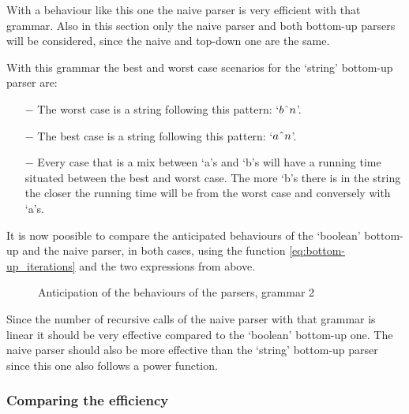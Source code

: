 With a behaviour like this one the naive parser is very efficient with that grammar.
Also in this section only the naive parser and both bottom-up parsers will be considered, since the naive and top-down one are the same.

With this grammar the best and worst case scenarios for the `string' bottom-up parser are:
\begin{itemize}
    \item[$-$] The worst case is a string following this pattern: `$b\string^ n$'.
    \item[$-$] The best case is a string following this pattern: `$a\string^ n$'.
    \item[$-$] Every case that is a mix between `a's and `b's will have a running time situated between the best and worst case.
        The more `b's there is in the string the closer the running time will be from the worst case and conversely with `a's.
\end{itemize}

It is now poosible to compare the anticipated behaviours of the `boolean' bottom-up and the naive parser, in both cases, using the function \ref{eq:bottom-up_iterations} and the two expressions from above.

\FloatBarrier
\begin{figure}[h]
\caption{Anticipation of the behaviours of the parsers, grammar 2}
\end{figure}
\FloatBarrier

Since the number of recursive calls of the naive parser with that grammar is linear it should be very effective compared to the `boolean' bottom-up one.
The naive parser should also be more effective than the `string' bottom-up parser since this one also follows a power function.

\subsubsection{Comparing the efficiency}

